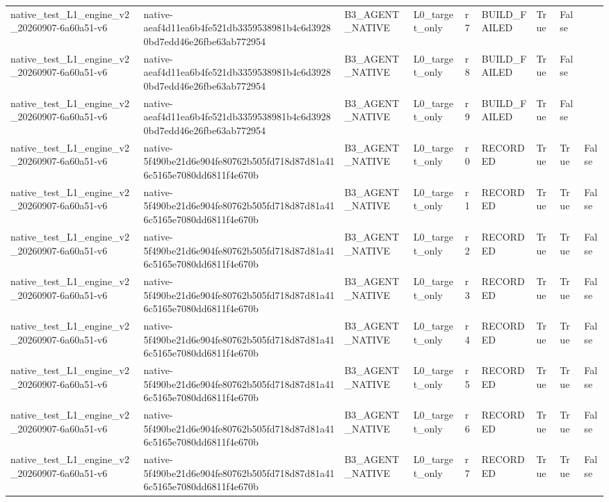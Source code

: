 \begin{tabular}{lllllllll}
native\_test\_L1\_engine\_v2\_20260907-6a60a51-v6 & native-aeaf4d11ea6b4fe521db3359538981b4c6d39280bd7edd46e26fbe63ab772954 & B3\_AGENT\_NATIVE & L0\_target\_only & r7 & BUILD\_FAILED & True & False &  \\
native\_test\_L1\_engine\_v2\_20260907-6a60a51-v6 & native-aeaf4d11ea6b4fe521db3359538981b4c6d39280bd7edd46e26fbe63ab772954 & B3\_AGENT\_NATIVE & L0\_target\_only & r8 & BUILD\_FAILED & True & False &  \\
native\_test\_L1\_engine\_v2\_20260907-6a60a51-v6 & native-aeaf4d11ea6b4fe521db3359538981b4c6d39280bd7edd46e26fbe63ab772954 & B3\_AGENT\_NATIVE & L0\_target\_only & r9 & BUILD\_FAILED & True & False &  \\
native\_test\_L1\_engine\_v2\_20260907-6a60a51-v6 & native-5f490be21d6e904fe80762b505fd718d87d81a416c5165e7080dd6811f4e670b & B3\_AGENT\_NATIVE & L0\_target\_only & r0 & RECORDED & True & True & False \\
native\_test\_L1\_engine\_v2\_20260907-6a60a51-v6 & native-5f490be21d6e904fe80762b505fd718d87d81a416c5165e7080dd6811f4e670b & B3\_AGENT\_NATIVE & L0\_target\_only & r1 & RECORDED & True & True & False \\
native\_test\_L1\_engine\_v2\_20260907-6a60a51-v6 & native-5f490be21d6e904fe80762b505fd718d87d81a416c5165e7080dd6811f4e670b & B3\_AGENT\_NATIVE & L0\_target\_only & r2 & RECORDED & True & True & False \\
native\_test\_L1\_engine\_v2\_20260907-6a60a51-v6 & native-5f490be21d6e904fe80762b505fd718d87d81a416c5165e7080dd6811f4e670b & B3\_AGENT\_NATIVE & L0\_target\_only & r3 & RECORDED & True & True & False \\
native\_test\_L1\_engine\_v2\_20260907-6a60a51-v6 & native-5f490be21d6e904fe80762b505fd718d87d81a416c5165e7080dd6811f4e670b & B3\_AGENT\_NATIVE & L0\_target\_only & r4 & RECORDED & True & True & False \\
native\_test\_L1\_engine\_v2\_20260907-6a60a51-v6 & native-5f490be21d6e904fe80762b505fd718d87d81a416c5165e7080dd6811f4e670b & B3\_AGENT\_NATIVE & L0\_target\_only & r5 & RECORDED & True & True & False \\
native\_test\_L1\_engine\_v2\_20260907-6a60a51-v6 & native-5f490be21d6e904fe80762b505fd718d87d81a416c5165e7080dd6811f4e670b & B3\_AGENT\_NATIVE & L0\_target\_only & r6 & RECORDED & True & True & False \\
native\_test\_L1\_engine\_v2\_20260907-6a60a51-v6 & native-5f490be21d6e904fe80762b505fd718d87d81a416c5165e7080dd6811f4e670b & B3\_AGENT\_NATIVE & L0\_target\_only & r7 & RECORDED & True & True & False \\

\end{tabular}
